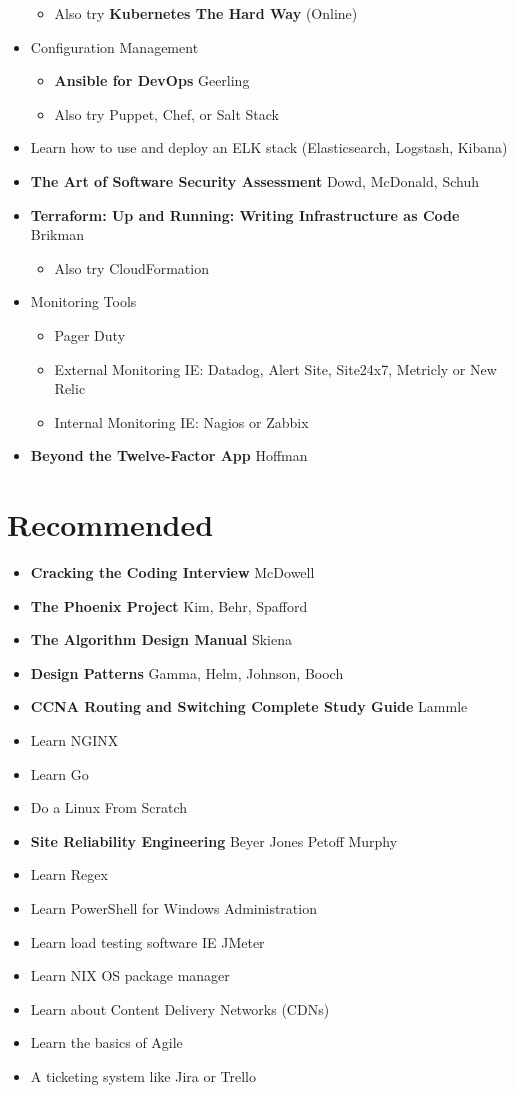 \documentclass[12pt]{article}
\begin{document}
\begin{itemize}
\begin{itemize}
  \item Also try \textbf{Kubernetes The Hard Way} (Online)
  \end{itemize}
\item Configuration Management
  \begin{itemize}
  \item \textbf{Ansible for DevOps} Geerling 
  \item Also try Puppet, Chef, or Salt Stack
  \end{itemize}
\item Learn how to use and deploy an ELK stack (Elasticsearch, Logstash, Kibana)
\item \textbf{The Art of Software Security Assessment} Dowd, McDonald, Schuh
\item \textbf{Terraform: Up and Running: Writing Infrastructure as Code}  Brikman
  \begin{itemize}
  \item Also try CloudFormation
  \end{itemize}
\item Monitoring Tools
  \begin{itemize}
  \item Pager Duty
  \item External Monitoring IE: Datadog, Alert Site, Site24x7, Metricly or New Relic
  \item Internal Monitoring IE: Nagios or Zabbix
  \end{itemize}
\item \textbf{Beyond the Twelve-Factor App} Hoffman
\end{itemize}

\section{Recommended}
\begin{itemize}
\item \textbf{Cracking the Coding Interview} McDowell
\item \textbf{The Phoenix Project} Kim, Behr, Spafford
\item \textbf{The Algorithm Design Manual} Skiena
\item \textbf{Design Patterns} Gamma, Helm, Johnson, Booch
\item \textbf{CCNA Routing and Switching Complete Study Guide} Lammle
\item Learn NGINX
\item Learn Go
\item Do a Linux From Scratch
\item \textbf{Site Reliability Engineering} Beyer Jones Petoff Murphy
\item Learn Regex
\item Learn PowerShell for Windows Administration
\item Learn load testing software IE JMeter
\item Learn NIX OS package manager
\item Learn about Content Delivery Networks (CDNs)
\item Learn the basics of Agile
\item A ticketing system like Jira or Trello
\end{itemize}
\end{document}
